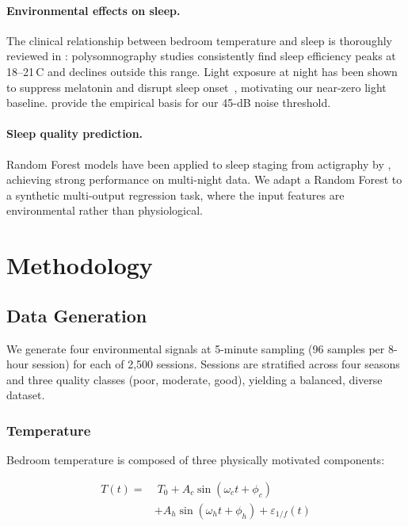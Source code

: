 \documentclass[11pt,a4paper,twocolumn]{article}
\begin{document}
\paragraph{Environmental effects on sleep.}
The clinical relationship between bedroom temperature and sleep is thoroughly
reviewed in \citet{okamoto2012}: polysomnography studies consistently find
sleep efficiency peaks at 18--21\,\textdegree C and declines outside this range.
Light exposure at night has been shown to suppress melatonin and disrupt
sleep onset~\citep{gooley2011}, motivating our near-zero light baseline.
\citet{hume2012} provide the empirical basis for our 45-dB noise threshold.

\paragraph{Sleep quality prediction.}
Random Forest models have been applied to sleep staging from actigraphy by
\citet{walch2019}, achieving strong performance on multi-night data.
We adapt a Random Forest to a synthetic multi-output regression task,
where the input features are environmental rather than physiological.

\section{Methodology}
\label{sec:method}

\subsection{Data Generation}

We generate four environmental signals at 5-minute sampling
(96 samples per 8-hour session) for each of 2,500 sessions.
Sessions are stratified across four seasons and three quality classes (poor,
moderate, good), yielding a balanced, diverse dataset.

\subsubsection{Temperature}

Bedroom temperature is composed of three physically motivated components:

\begin{equation}
\begin{split}
  T(t) = &\; T_0 + A_c \sin(\omega_c t + \phi_c) \\
         &+ A_h \sin(\omega_h t + \phi_h) + \varepsilon_{1/f}(t)
\end{split}
\label{eq:temperature}
\end{equation}
\end{document}
